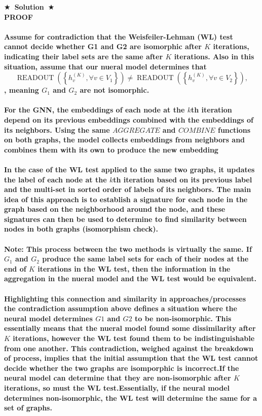 \documentclass{article}
\numberwithin{figure}{section}
\newcommand{\Solution}[1]{{\medskip \color{red} \bf $\bigstar$~\sf \textbf{Solution}~$\bigstar$ \sf #1 } \bigskip}
\begin{document}
\Solution{
\\
\textbf{PROOF}
\\
\\
Assume for contradiction that the Weisfeiler-Lehman (WL) test cannot decide whether G1 and G2 are isomorphic after $K$ iterations, indicating their label sets are the same after $K$ iterations. Also in this situation, assume that our nueral model determines that $$\operatorname { READOUT }\left(\left\{h_v^{(K)}, \forall v \in V_1\right\}\right) \neq \operatorname { READOUT }\left(\left\{h_v^{(K)}, \forall v \in V_2\right\}\right),$$, meaning $G_1$ and $G_2$ are not isomorphic.
\\\\
For the GNN, the embeddings of each node at the $k$th iteration depend on its previous embeddings combined with the embeddings of its neighbors. Using the same $AGGREGATE$ and $COMBINE$ functions on both graphs, the model collects embeddings from neighbors and combines them with its own to produce the new embedding
\\\\
In the case of the WL test applied to the same two graphs, it updates the label of each node at the $k$th iteration based on its previous label and the multi-set in sorted order of labels of its neighbors. The main idea of this approach is to establish a signature for each node in the graph based on the neighborhood around the node, and these signatures can then be used to determine to find similarity between nodes in both graphs (isomorphism check). \\\\

Note: This process between the two methods is virtually the same. If $G_1$ and $G_2$ produce the same label sets for each of their nodes at the end of $K$ iterations in the WL test, then the information in the aggregation in the nueral model and the WL test would be equivalent.\\\\

Highlighting this connection and similarity in approaches/processes the contradiction assumption above defines a situation where the neural model determines $G1$ and $G2$ to be non-isomorphic. This essentially means that the nueral model found some dissimilarity after $K$ iterations, however the WL test found them to be indistinguishable from one another. This contradiction, weighed against the breakdown of process, implies that the initial assumption that the WL test cannot decide whether the two graphs are isomporphic is incorrect.If the neural model can determine that they are non-isomorphic after $K$ iterations, so must the WL test.Essentially, if the neural model determines non-isomorphic, the WL test will determine the same for a set of graphs. \\\\

}
\end{document}
